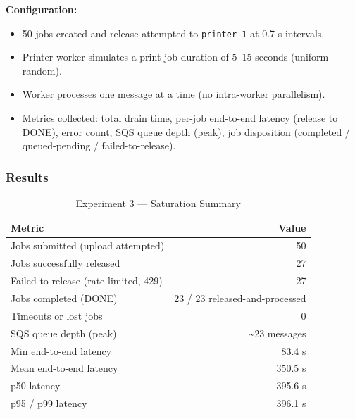 \documentclass[11pt,letterpaper]{article}
\newcommand{\code}[1]{\texttt{\small #1}}
\begin{document}
\textbf{Configuration:}
\begin{itemize}[noitemsep]
  \item 50 jobs created and release-attempted to \code{printer-1} at 0.7 s intervals.
  \item Printer worker simulates a print job duration of 5--15 seconds (uniform random).
  \item Worker processes one message at a time (no intra-worker parallelism).
  \item Metrics collected: total drain time, per-job end-to-end latency (release to DONE), error count, SQS queue depth (peak), job disposition (completed / queued-pending / failed-to-release).
\end{itemize}

\subsubsection{Results}

\begin{table}[H]
\centering
\caption{Experiment 3 --- Saturation Summary}
\begin{tabular}{@{}lr@{}}
\toprule
\textbf{Metric} & \textbf{Value} \\
\midrule
Jobs submitted (upload attempted)         & 50 \\
Jobs successfully released                & 27 \\
Failed to release (rate limited, 429)     & 27 \\
Jobs completed (DONE)                     & 23 / 23 released-and-processed \\
Timeouts or lost jobs                     & 0 \\
SQS queue depth (peak)                    & \textasciitilde23 messages \\
Min end-to-end latency                    & 83.4 s \\
Mean end-to-end latency                   & 350.5 s \\
p50 latency                               & 395.6 s \\
p95 / p99 latency                         & 396.1 s \\
\bottomrule
\end{tabular}
\end{table}
\end{document}
